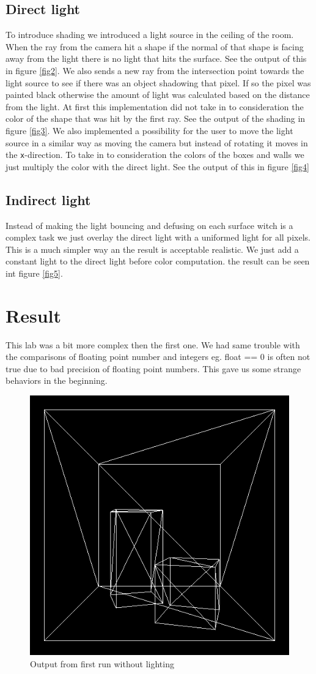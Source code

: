 \documentclass[a4paper,11pt]{article}
\begin{document}
\subsection{Direct light}
To introduce shading we introduced a light source in the ceiling of the room. When the ray from the camera hit a shape if the normal of that shape is facing away from the light there is no light that hits the surface. See the output of this in figure \ref{fig2}. We also sends a new ray from the intersection point towards the light source to see if there was an object shadowing that pixel. If so the pixel was painted black otherwise the amount of light was calculated based on the distance from the light. At first this implementation did not take in to consideration the color of the shape that was hit by the first ray. See the output of the shading in figure \ref{fig3}.
We also implemented a possibility for the user to move the light source in a similar way as moving the camera but instead of rotating it moves in the \verb|x|-direction.
To take in to consideration the colors of the boxes and walls we just multiply the color with the direct light. See the output of this in figure \ref{fig4}

\subsection{Indirect light}
Instead of making the light bouncing and defusing on each surface witch is a complex task we just overlay the direct light with a uniformed light for all pixels. This is a much simpler way an the result is acceptable realistic. We just add a constant light to the direct light before color computation. the result can be seen int figure \ref{fig5}. 

\section{Result}
This lab was a bit more complex then the first one. We had same trouble with the comparisons of floating point number and integers eg. float == 0 is often not true due to bad precision of floating point numbers. This gave us some strange behaviors in the beginning.

\begin{figure}[h!]
	\centering	
	\includegraphics[width=0.45\linewidth]{screenshot1.png}
	\caption{Output from first run without lighting}
	\label{fig1}
\end{figure}
\end{document}
